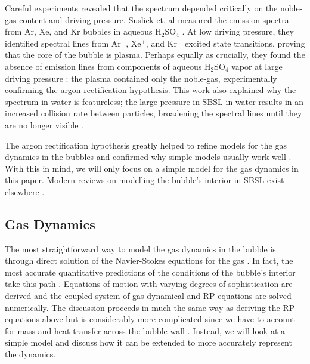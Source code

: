 \documentclass[11pt,prb,aps,nofootinbib,superscriptaddress,floatfix]{revtex4-2}
\begin{document}
Careful experiments revealed that the spectrum depended critically on the noble-gas content and driving pressure. Suslick et. al measured the emission spectra from Ar, Xe, and Kr bubbles in aqueous H$_2$SO$_4$ \cite{flannigan2005plasma,flannigan2005plasma1,flannigan2006measurement,suslick2008inside}. At low driving pressure, they identified spectral lines from Ar$^+$, Xe$^+$, and Kr$^+$ excited state transitions, proving that the core of the bubble is plasma. Perhaps equally as crucially, they found the absence of emission lines from components of aqueous H$_2$SO$_4$ vapor at large driving pressure \cite{suslick2008inside,flannigan2006measurement,flannigan2006measurement}: the plasma contained only the noble-gas, experimentally confirming the argon rectification hypothesis. This work also explained why the spectrum in water is featureless; the large pressure in SBSL in water results in an increased collision rate between particles, broadening the spectral lines until they are no longer visible  \cite{an2009diagnosing,suslick2008inside,flannigan2005plasma,flannigan2005plasma1,flannigan2006measurement}.

The argon rectification hypothesis greatly helped to refine models for the gas dynamics in the bubbles and confirmed why simple models usually work well \cite{suslick2008inside,brenner2002single}. With this in mind, we will only focus on a simple model for the gas dynamics in this paper. Modern reviews on modelling the bubble's interior in SBSL exist elsewhere \cite{brenner2002single,yasui2018acoustic,brennen2014cavitation}. 

\subsection{Gas Dynamics}
The most straightforward way to model the gas dynamics in the bubble is through direct solution of the Navier-Stokes equations for the gas \cite{brenner2002single}. In fact, the most accurate quantitative predictions of the conditions of the bubble's interior take this path \cite{an2006mechanism,an2008spectral,an2009diagnosing,flannigan2005plasma,flannigan2005plasma1,flannigan2006measurement}. Equations of motion with varying degrees of sophistication are derived and the coupled system of gas dynamical and RP equations are solved numerically. The discussion proceeds in much the same way as deriving the RP equations above but is considerably more complicated since we have to account for mass and heat transfer across the bubble wall \cite{brenner2002single,yasui2018acoustic}. Instead, we will look at a simple model and discuss how it can be extended to more accurately represent the dynamics.
\end{document}
